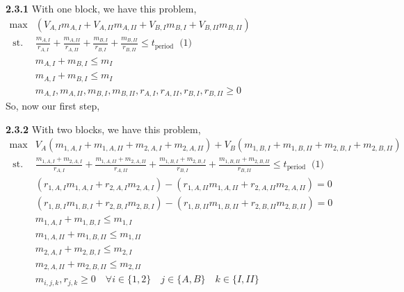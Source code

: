\documentclass[11pt]{article}
\begin{document}
\noindent \textbf{2.3.1} With one block, we have this problem, 
\\

$\begin{aligned} 
    \max & \left(V_{A, I} m_{A, I}+V_{A, II} m_{A, II}+V_{B, I} m_{B, I}+V_{B, II} m_{B, II}\right) \\ 
    \text { st. } &   \frac{m_{A, I}}{r_{A, I}}+\frac{m_{A, II}}{r_{A, II}}+\frac{m_{B, I}}{r_{B, I}}+\frac{m_{B, II}}{r_{B, II}} \leqslant t_{\text {period }} \text { (1) } \\ 
    & m_{A, I}+m_{B, I} \leqslant m_{I}  \\ 
    & m_{A, I}+m_{B, I} \leqslant m_{I}  \\ 
    & m_{A, I}, m_{A, II}, m_{B, I}, m_{B, II}, r_{A, I}, r_{A, II}, r_{B, I}, r_{B, II} \geqslant 0
\end{aligned}$
\\

\noindent So, now our first step, 

\noindent \textbf{2.3.2} With two blocks, we have this problem, 
\\

$\begin{aligned} 
    \max & V_A(m_{1,A,I} +m_{1,A,II} + m_{2,A,I}+ m_{2,A,II}) + V_B(m_{1,B,I} + m_{1,B,II} + m_{2,B,I} + m_{2,B,II}) \\ 
    \text { st. } & \frac{m_{1,A,I} + m_{2,A,I}}{r_{A,I}} + \frac{m_{1,A,II} + m_{2,A,II}}{r_{A,II}} + \frac{m_{1,B,I} + m_{2,B,I}}{r_{B,I}} + \frac{m_{1,B,II} + m_{2,B,II}}{r_{B,II}} \leqslant t_{\text {period }} \text { (1) } \\ 
    & (r_{1,A,I} m_{1,A, I} + r_{2,A,I} m_{2,A, I}) - (r_{1,A,II} m_{1,A, II} + r_{2,A,II} m_{2,A, II}) = 0\\
    & (r_{1,B,I} m_{1,B, I} + r_{2,B,I} m_{2,B, I}) - (r_{1,B,II} m_{1,B, II} + r_{2,B,II} m_{2,B, II}) = 0\\
    & m_{1,A, I}+m_{1,B, I} \leqslant m_{1,I}  \\ 
    & m_{1,A, II}+m_{1,B, II} \leqslant m_{1,II}  \\ 
    & m_{2,A, I}+m_{2,B, I} \leqslant m_{2,I}  \\ 
    & m_{2,A, II}+m_{2,B, II} \leqslant m_{2,II}  \\ 
    & m_{i,j,k}, r_{j,k} \geqslant 0 \quad \forall i \in \{1,2\} \quad j \in \{A,B\} \quad k \in \{I,II\}
\end{aligned}$\\
\end{document}
